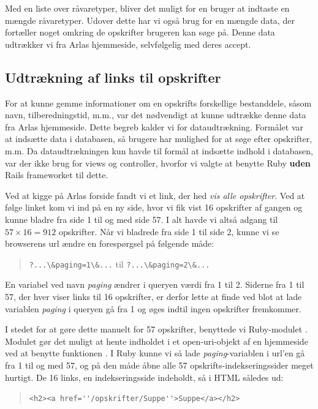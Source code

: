 Med en liste over råvaretyper, bliver det muligt for en bruger at indtaste en mængde råvaretyper. Udover dette har vi også brug for en mængde data, der fortæller noget omkring de opskrifter brugeren kan søge på. Denne data udtrækker vi fra Arlas hjemmeside, selvfølgelig med deres accept.

\subsection{Udtrækning af links til opskrifter}

For at kunne gemme informationer om en opskrifts forskellige bestanddele, såsom navn, tilberedningstid, m.m., var det nødvendigt at kunne udtrække denne data fra Arlas hjemmeside. Dette begreb kalder vi for dataudtrækning. Formålet var at indsætte data i databasen, så brugere har mulighed for at søge efter opskrifter, m.m. Da dataudtrækningen kun havde til formål at indsætte indhold i databasen, var der ikke brug for views og controller, hvorfor vi valgte at benytte Ruby \textbf{uden} Rails frameworket til dette.

Ved at kigge på Arlas forside fandt vi et link, der hed \textit{vis alle opskrifter}. Ved at følge linket kom vi ind på en ny side, hvor vi fik vist 16 opskrifter af gangen og kunne bladre fra side 1 til og med side 57. I alt havde vi altså adgang til $57 \times 16 = 912$ opskrifter. Når vi bladrede fra side 1 til side 2, kunne vi se browserens url ændre en forespørgsel på følgende måde:

\begin{quote}
\lstinline{?...\&paging=1\&...} til \lstinline{?...\&paging=2\&...}
\end{quote}

En variabel ved navn \textit{paging} ændrer i queryen værdi fra 1 til 2. Siderne fra 1 til 57, der hver viser links til 16 opskrifter, er derfor lette at finde ved blot at lade variablen \textit{paging} i queryen gå fra 1 og øges indtil ingen opskrifter fremkommer.

I stedet for at gøre dette manuelt for 57 opskrifter, benyttede vi Ruby-modulet . Modulet gør det muligt at hente indholdet i et open-uri-objekt af en hjemmeside ved at benytte funktionen . I Ruby kunne vi så lade \textit{paging}-variablen i url'en gå fra 1 til og med 57, og på den måde åbne alle 57 opskrifts-indekseringssider meget hurtigt. De 16 links, en indekseringsside indeholdt, så i HTML således ud:

\begin{quote}
  \lstinline{<h2><a href=''/opskrifter/Suppe''>Suppe</a></h2>}
\end{quote}

